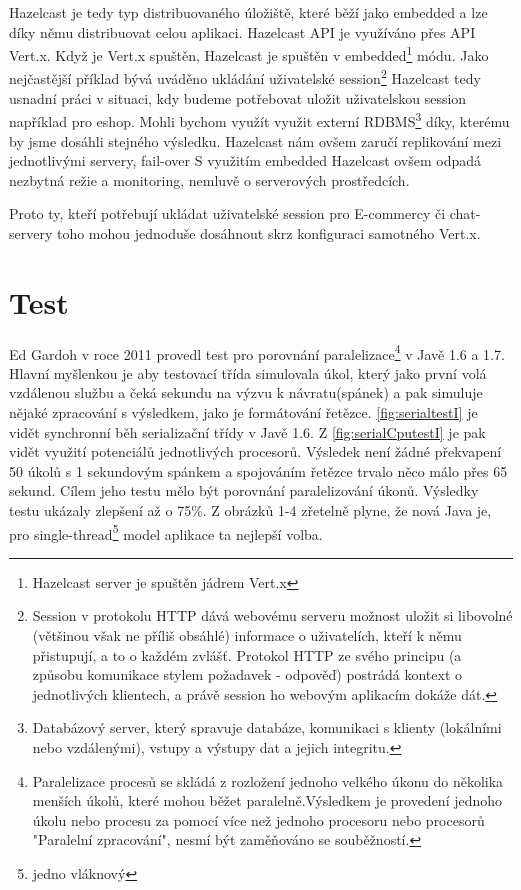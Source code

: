 Hazelcast je tedy typ distribuovaného úložiště, které běží jako embedded a lze díky němu distribuovat celou aplikaci. Hazelcast API je využíváno přes API Vert.x. Když je Vert.x spuštěn, Hazelcast je spuštěn v embedded\footnote{Hazelcast server je spuštěn jádrem Vert.x} módu. 
Jako nejčastější příklad bývá uváděno ukládání uživatelské session\footnote{Session v protokolu HTTP dává webovému serveru možnost uložit si libovolné (většinou však ne příliš obsáhlé) informace o uživatelích, kteří k němu přistupují, a to o každém zvlášť. Protokol HTTP ze svého principu (a způsobu komunikace stylem požadavek - odpověď) postrádá kontext o jednotlivých klientech, a právě session ho webovým aplikacím dokáže dát.} Hazelcast tedy usnadní práci v situaci, kdy budeme potřebovat uložit uživatelskou session například pro eshop. Mohli bychom využít využit externí RDBMS\footnote{Databázový server, který spravuje databáze, komunikaci s klienty (lokálními nebo vzdálenými), vstupy a výstupy dat a jejich integritu.} díky, kterému by jsme dosáhli stejného výsledku. Hazelcast nám ovšem zaručí replikování mezi jednotlivými servery, fail-over S využitím embedded Hazelcast ovšem odpadá nezbytná režie a monitoring, nemluvě o serverových prostředcích.

Proto ty, kteří potřebují ukládat uživatelské session pro E-commercy či chat-servery toho mohou jednoduše dosáhnout skrz konfiguraci samotného Vert.x.


\section{Test}
Ed Gardoh v roce 2011 provedl test\cite{serialTest} pro porovnání paralelizace\footnote{Paralelizace procesů se skládá z rozložení jednoho velkého úkonu do několika menších úkolů, které mohou běžet paralelně.Výsledkem je provedení jednoho úkolu nebo procesu za pomocí více než jednoho procesoru nebo procesorů "Paralelní zpracování", nesmí být zaměňováno se souběžností.} v Javě 1.6 a 1.7.
Hlavní myšlenkou je aby testovací třída simulovala úkol, který jako první volá vzdálenou službu a čeká sekundu na výzvu k návratu(spánek) a pak simuluje nějaké zpracování s výsledkem, jako je formátování řetězce.
\vref{fig:serialtestI} je vidět synchronní běh serializační třídy v Javě 1.6. Z \vref{fig:serialCputestI} je pak vidět využití potenciálů jednotlivých procesorů.
Výsledek není žádné překvapení 50 úkolů s 1 sekundovým spánkem a spojováním řetězce trvalo něco málo přes 65 sekund. 
Cílem jeho testu mělo být porovnání paralelizování úkonů. Výsledky testu ukázaly zlepšení až o 75\%. Z obrázků 1-4 zřetelně plyne, že nová Java je, pro single-thread\footnote{jedno vláknový} model aplikace ta nejlepší volba.

